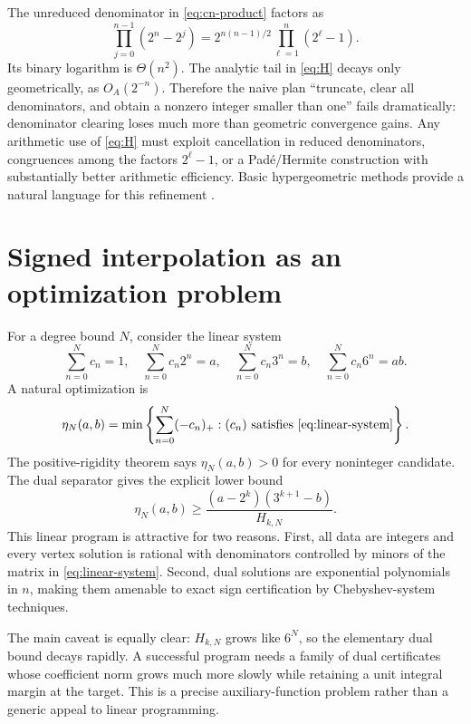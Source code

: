 \documentclass[11pt]{article}
\theoremstyle{definition}
\begin{document}
The unreduced denominator in \eqref{eq:cn-product} factors as
\begin{equation}\label{eq:den-factor}
 \prod_{j=0}^{n-1}(2^n-2^j)
 =2^{n(n-1)/2}\prod_{\ell=1}^n(2^\ell-1).
\end{equation}
Its binary logarithm is $\Theta(n^2)$.  The analytic tail in \eqref{eq:H} decays only geometrically, as $O_A(2^{-n})$.  Therefore the naive plan ``truncate, clear all denominators, and obtain a nonzero integer smaller than one'' fails dramatically: denominator clearing loses much more than geometric convergence gains.  Any arithmetic use of \eqref{eq:H} must exploit cancellation in reduced denominators, congruences among the factors $2^\ell-1$, or a Pad\'e/Hermite construction with substantially better arithmetic efficiency.  Basic hypergeometric methods provide a natural language for this refinement \cite{GasperRahman2004}.

\section{Signed interpolation as an optimization problem}\label{sec:optimization}

For a degree bound $N$, consider the linear system
\begin{equation}\label{eq:linear-system}
 \sum_{n=0}^Nc_n=1,\quad
 \sum_{n=0}^Nc_n2^n=a,\quad
 \sum_{n=0}^Nc_n3^n=b,\quad
 \sum_{n=0}^Nc_n6^n=ab.
\end{equation}
A natural optimization is
\[
 \eta_N(a,b)=\min\left\{\sum_{n=0}^N(-c_n)_+: (c_n)\text{ satisfies \eqref{eq:linear-system}}\right\}.
\]
The positive-rigidity theorem says $\eta_N(a,b)>0$ for every noninteger candidate.  The dual separator gives the explicit lower bound
\[
 \eta_N(a,b)\ge\frac{(a-2^k)(3^{k+1}-b)}{H_{k,N}}.
\]
This linear program is attractive for two reasons.  First, all data are integers and every vertex solution is rational with denominators controlled by minors of the matrix in \eqref{eq:linear-system}.  Second, dual solutions are exponential polynomials in $n$, making them amenable to exact sign certification by Chebyshev-system techniques.

The main caveat is equally clear: $H_{k,N}$ grows like $6^N$, so the elementary dual bound decays rapidly.  A successful program needs a family of dual certificates whose coefficient norm grows much more slowly while retaining a unit integral margin at the target.  This is a precise auxiliary-function problem rather than a generic appeal to linear programming.
\end{document}
